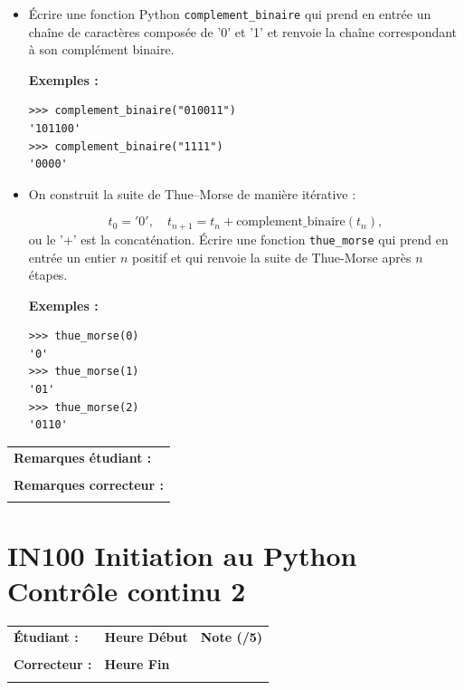 \documentclass[a4paper,11pt]{article}
\begin{document}
\begin{itemize}
\item[1.] Écrire une fonction Python  \texttt{complement\_binaire}  qui prend en entrée un chaîne de caractères composée de '0' et '1' et 
    renvoie la chaîne correspondant à son complément binaire. 

\textbf{Exemples :}
\vspace{-0.3 cm}
\begin{verbatim}
>>> complement_binaire("010011")
'101100'
>>> complement_binaire("1111")
'0000'
\end{verbatim}


\item[2.] On construit la suite de Thue--Morse de manière itérative :
\vspace{-0.3 cm}

\[
t_0 = '0', \quad t_{n+1} = t_n + \text{complement\_binaire}(t_n),
\]
ou le '+' est la concaténation. 
Écrire une fonction \texttt{thue\_morse}
  qui prend en entrée un entier   $n$ positif
    et qui renvoie la suite de Thue-Morse après $n$ étapes. 

\textbf{Exemples :}
\vspace{-0.3 cm}
\begin{verbatim}
>>> thue_morse(0)
'0'
>>> thue_morse(1)
'01'
>>> thue_morse(2)
'0110'
\end{verbatim}
\end{itemize}
\vspace{-0.5 cm}
\begin{table}[h!]
\centering
\renewcommand{\arraystretch}{1.4} %
\begin{tabular}{|p{15cm}|}
\hline
\textbf{Remarques étudiant :}    \\
 \\
\hline
\textbf{Remarques correcteur :}  \\
 \\
\hline
\end{tabular}
\end{table}

\newpage


\section*{\center IN100 Initiation au Python\\
Contrôle continu 2}


\begin{table}[h!]
\centering
\renewcommand{\arraystretch}{1.4} %
\begin{tabular}{|p{10cm}|p{3cm}|p{2cm}|}
\hline
\textbf{Étudiant :} & \textbf{Heure Début }  & \textbf{Note (/5) }  \\
& & \\
\hline
\textbf{Correcteur :} & \textbf{Heure Fin } & \\
& & \\
\hline

\hline
\end{tabular}
\end{table}
\end{document}
